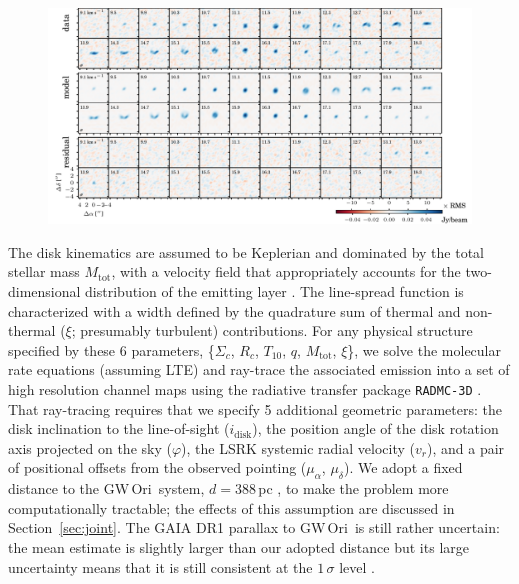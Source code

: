 \documentclass[twocolumn]{aastex61}
\newcommand{\obj}{GW\,Ori}
\begin{document}
\begin{figure}[ht!]
\begin{center}
  \includegraphics{chmaps_C18O.pdf}
  \end{center}
\end{figure}


The disk kinematics are assumed to be Keplerian and dominated by the total stellar mass $M_\mathrm{tot}$, with a velocity field that appropriately accounts for the two-dimensional distribution of the emitting layer \citep[see][]{rosenfeld13a}.  The  line-spread function is characterized with a width defined by the quadrature sum of thermal and non-thermal ($\xi$; presumably turbulent) contributions. For any physical structure specified by these 6 parameters, \{$\Sigma_c$, $R_c$, $T_{10}$, $q$, $M_\mathrm{tot}$, $\xi$\}, we solve the molecular rate equations (assuming LTE) and ray-trace the associated emission into a set of high resolution channel maps using the radiative transfer package {\tt RADMC-3D} \citep{dullemond12}. That ray-tracing requires that we specify 5 additional geometric parameters: the disk inclination to the line-of-sight ($i_\mathrm{disk}$), the position angle of the disk rotation axis projected on the sky ($\varphi$), the LSRK systemic radial velocity ($v_r$), and a pair of positional offsets from the observed pointing ($\mu_\alpha$, $\mu_\delta$). We adopt a fixed distance to the \obj\ system, $d = 388\,$pc \citep{kounkel17}, to make the problem more computationally tractable; the effects of this assumption are discussed in Section~\ref{sec:joint}. The GAIA DR1 parallax to \obj\ is still rather uncertain: the mean estimate is slightly larger than our adopted distance but its large uncertainty means that it is still consistent at the $1\,\sigma$ level \citep[$\pi = 2.1 \pm0.5\,$mas;][]{gaia16}.
\end{document}
